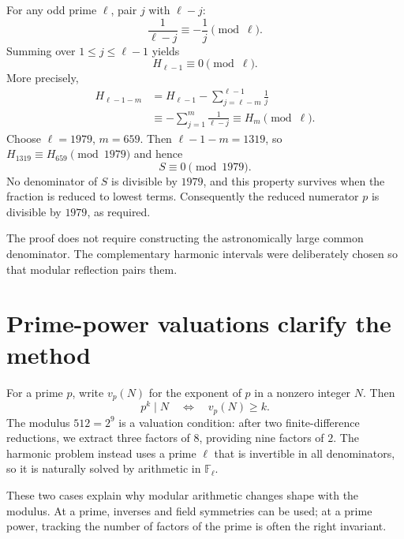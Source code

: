 For any odd prime \(\ell\), pair \(j\) with \(\ell-j\):
\[
 \frac1{\ell-j}\equiv-\frac1j\pmod\ell.
\]
Summing over \(1\le j\le\ell-1\) yields
\[
 H_{\ell-1}\equiv0\pmod\ell.
\]
More precisely,
\[
\begin{aligned}
 H_{\ell-1-m}
 &=H_{\ell-1}-\sum_{j=\ell-m}^{\ell-1}\frac1j\\
 &\equiv -\sum_{j=1}^{m}\frac1{\ell-j}
 \equiv H_m\pmod\ell.
\end{aligned}
\]
Choose \(\ell=1979\), \(m=659\). Then \(\ell-1-m=1319\), so \(H_{1319}\equiv H_{659}\pmod{1979}\) and hence
\[
 \boxed{S\equiv0\pmod{1979}.}
\]
No denominator of \(S\) is divisible by \(1979\), and this property survives when the fraction is reduced to lowest terms. Consequently the reduced numerator \(p\) is divisible by \(1979\), as required.

The proof does not require constructing the astronomically large common denominator. The complementary harmonic intervals were deliberately chosen so that modular reflection pairs them.

\section{Prime-power valuations clarify the method}

For a prime \(p\), write \(v_p(N)\) for the exponent of \(p\) in a nonzero integer \(N\). Then
\[
 p^k\mid N\quad\Longleftrightarrow\quad v_p(N)\ge k.
\]
The modulus \(512=2^9\) is a valuation condition: after two finite-difference reductions, we extract three factors of \(8\), providing nine factors of \(2\). The harmonic problem instead uses a prime \(\ell\) that is invertible in all denominators, so it is naturally solved by arithmetic in \(\mathbb F_\ell\).

These two cases explain why modular arithmetic changes shape with the modulus. At a prime, inverses and field symmetries can be used; at a prime power, tracking the number of factors of the prime is often the right invariant.
